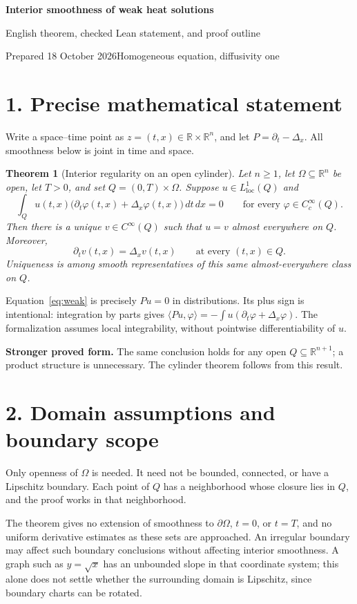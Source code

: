 \documentclass[11pt,letterpaper]{article}
\newtheorem{theorem}{Theorem}
\newcommand{\R}{\mathbb R}
\newcommand{\Lloc}{L^1_{\mathrm{loc}}}
\begin{document}
{\color{ink}\LARGE\bfseries Interior smoothness of weak heat solutions\par}
{\large English theorem, checked Lean statement, and proof outline\par}
{\small Prepared 18 October 2026\quad\textbullet\quad Homogeneous equation, diffusivity one}

\section*{1. Precise mathematical statement}
Write a space--time point as $z=(t,x)\in\R\times\R^n$, and let
$P=\partial_t-\Delta_x$. All smoothness below is joint in time and space.

\begin{theorem}[Interior regularity on an open cylinder]
Let $n\geq1$, let $\Omega\subseteq\R^n$ be open, let $T>0$, and set
$Q=(0,T)\times\Omega$. Suppose $u\in\Lloc(Q)$ and
\begin{equation}\label{eq:weak}
  \int_Q u(t,x)\bigl(\partial_t\varphi(t,x)+\Delta_x\varphi(t,x)\bigr)
  \,dt\,dx=0
  \qquad\text{for every }\varphi\in C_c^\infty(Q).
\end{equation}
Then there is a unique $v\in C^\infty(Q)$ such that $u=v$ almost everywhere on
$Q$. Moreover,
\[
  \partial_t v(t,x)=\Delta_x v(t,x)\qquad\text{at every }(t,x)\in Q.
\]
Uniqueness is among smooth representatives of this same almost-everywhere
class on $Q$.
\end{theorem}

Equation~\eqref{eq:weak} is precisely $Pu=0$ in distributions. Its plus sign
is intentional: integration by parts gives
$\langle Pu,\varphi\rangle=-\int u(\partial_t\varphi+\Delta_x\varphi)$.
The formalization assumes local integrability, without pointwise differentiability
of $u$.

\textbf{Stronger proved form.}
The same conclusion holds for any open $Q\subseteq\R^{n+1}$; a product
structure is unnecessary. The cylinder theorem follows from this result.

\section*{2. Domain assumptions and boundary scope}
Only openness of $\Omega$ is needed. It need not be bounded, connected, or
have a Lipschitz boundary. Each point of $Q$ has a neighborhood whose closure
lies in $Q$, and the proof works in that neighborhood.

The theorem gives no extension of smoothness to $\partial\Omega$, $t=0$, or
$t=T$, and no uniform derivative estimates as these sets are approached.
An irregular boundary may affect such boundary conclusions without affecting
interior smoothness. A graph such as $y=\sqrt{x}$ has an unbounded slope in
that coordinate system; this alone does not settle whether the surrounding
domain is Lipschitz, since boundary charts can be rotated.
\end{document}
